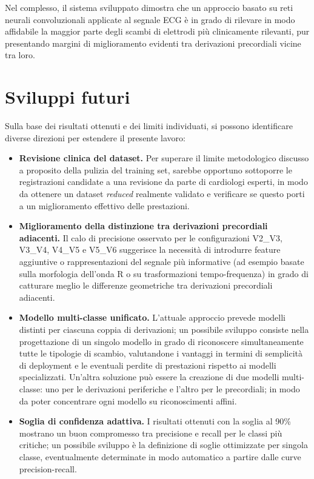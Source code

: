 Nel complesso, il sistema sviluppato dimostra che un approccio basato su reti neurali convoluzionali applicate al segnale ECG è in grado di rilevare in modo affidabile la maggior parte degli scambi di elettrodi più clinicamente rilevanti, pur presentando margini di miglioramento evidenti tra derivazioni precordiali vicine tra loro.

\section{Sviluppi futuri}

Sulla base dei risultati ottenuti e dei limiti individuati, si possono identificare diverse direzioni per estendere il presente lavoro:

\begin{itemize}
	\item \textbf{Revisione clinica del dataset.} Per superare il limite metodologico discusso a proposito della pulizia del training set, sarebbe opportuno sottoporre le registrazioni candidate a una revisione da parte di cardiologi esperti, in modo da ottenere un dataset \emph{reduced} realmente validato e verificare se questo porti a un miglioramento effettivo delle prestazioni.
	
	\item \textbf{Miglioramento della distinzione tra derivazioni precordiali adiacenti.} Il calo di precisione osservato per le configurazioni V2\_V3, V3\_V4, V4\_V5 e V5\_V6 suggerisce la necessità di introdurre feature aggiuntive o rappresentazioni del segnale più informative (ad esempio basate sulla morfologia dell'onda R o su trasformazioni tempo-frequenza) in grado di catturare meglio le differenze geometriche tra derivazioni precordiali adiacenti.
	
	\item \textbf{Modello multi-classe unificato.} L'attuale approccio prevede modelli distinti per ciascuna coppia di derivazioni; un possibile sviluppo consiste nella progettazione di un singolo modello in grado di riconoscere simultaneamente tutte le tipologie di scambio, valutandone i vantaggi in termini di semplicità di deployment e le eventuali perdite di prestazioni rispetto ai modelli specializzati. Un'altra soluzione può essere la creazione di due modelli multi-classe: uno per le derivazioni periferiche e l'altro per le precordiali; in modo da poter concentrare ogni modello su riconoscimenti affini.
	
	\item \textbf{Soglia di confidenza adattiva.} I risultati ottenuti con la soglia al 90\% mostrano un buon compromesso tra precisione e recall per le classi più critiche; un possibile sviluppo è la definizione di soglie ottimizzate per singola classe, eventualmente determinate in modo automatico a partire dalle curve precision-recall.
	

\end{itemize}
